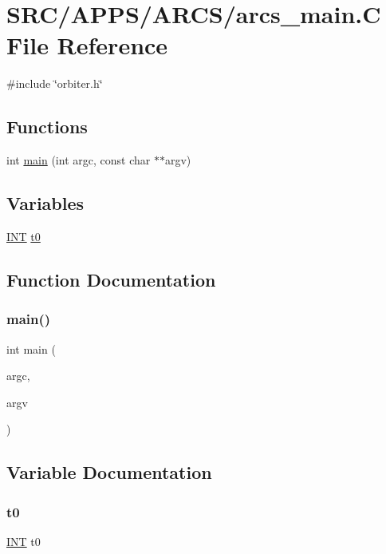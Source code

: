 \hypertarget{arcs__main_8_c}{}\section{S\+R\+C/\+A\+P\+P\+S/\+A\+R\+C\+S/arcs\+\_\+main.C File Reference}
\label{arcs__main_8_c}
{\ttfamily \#include \char`\"{}orbiter.\+h\char`\"{}}\newline
\subsection*{Functions}
\begin{DoxyCompactItemize}
\item 
int \mbox{\hyperlink{arcs__main_8_c_a217dbf8b442f20279ea00b898af96f52}{main}} (int argc, const char $\ast$$\ast$argv)
\end{DoxyCompactItemize}
\subsection*{Variables}
\begin{DoxyCompactItemize}
\item 
\mbox{\hyperlink{galois_8h_a09fddde158a3a20bd2dcadb609de11dc}{I\+NT}} \mbox{\hyperlink{arcs__main_8_c_a4268f4fe222ffb119218a0199f5e1904}{t0}}
\end{DoxyCompactItemize}


\subsection{Function Documentation}
\mbox{\label{arcs__main_8_c_a217dbf8b442f20279ea00b898af96f52}} 
\subsubsection{\texorpdfstring{main()}{main()}}
{\footnotesize\ttfamily int main (\begin{DoxyParamCaption}\item[{int}]{argc,  }\item[{const char $\ast$$\ast$}]{argv }\end{DoxyParamCaption})}



\subsection{Variable Documentation}
\mbox{\label{arcs__main_8_c_a4268f4fe222ffb119218a0199f5e1904}} 
\subsubsection{\texorpdfstring{t0}{t0}}
{\footnotesize\ttfamily \mbox{\hyperlink{galois_8h_a09fddde158a3a20bd2dcadb609de11dc}{I\+NT}} t0}


